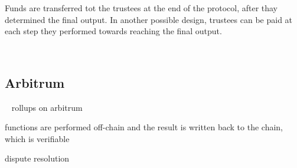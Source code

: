 Funds are transferred tot the trustees at the end of the protocol, after thay determined the final output. In another possible design, trustees can be paid at each step they performed towards reaching the final output.

~\subsection{Arbitrum}
~\cite{kalodner2018arbitrum}
rollups on arbitrum

functions are performed off-chain and the result is written back to the chain, which is verifiable

dispute resolution
